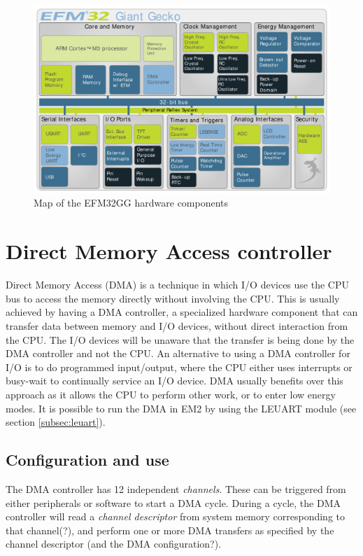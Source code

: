 \begin{figure}[ht]
  \centering
  \includegraphics[width=\textwidth]{images/giant_gecko_map.png}
  \caption{Map of the EFM32GG hardware components}\label{fig:giant-gecko-map}
\end{figure}

\section{Direct Memory Access controller}
Direct Memory Access (DMA) is a technique in which I/O devices use the CPU bus to access the memory directly without involving the CPU. 
This is usually achieved by having a DMA controller, a specialized hardware component that can transfer data between memory and I/O devices, without direct interaction from the CPU. The I/O devices will be unaware that the transfer is being done by the DMA controller and not the CPU. An alternative to using a DMA controller for I/O is to do programmed input/output, where the CPU either uses interrupts or busy-wait to continually service an I/O device. DMA usually benefits over this approach as it allows the CPU to perform other work, or to enter low energy modes.
It is possible to run the DMA in EM2 by using the LEUART module (see section \ref{subsec:leuart}).

\subsection{Configuration and use}
The DMA controller has 12 independent \emph{channels}. These can be triggered from either peripherals or software to start a DMA cycle. During a cycle, the DMA controller will read a \emph{channel descriptor} from system memory corresponding to that channel(?), and perform one or more DMA transfers as specified by the channel descriptor (and the DMA configuration?).

